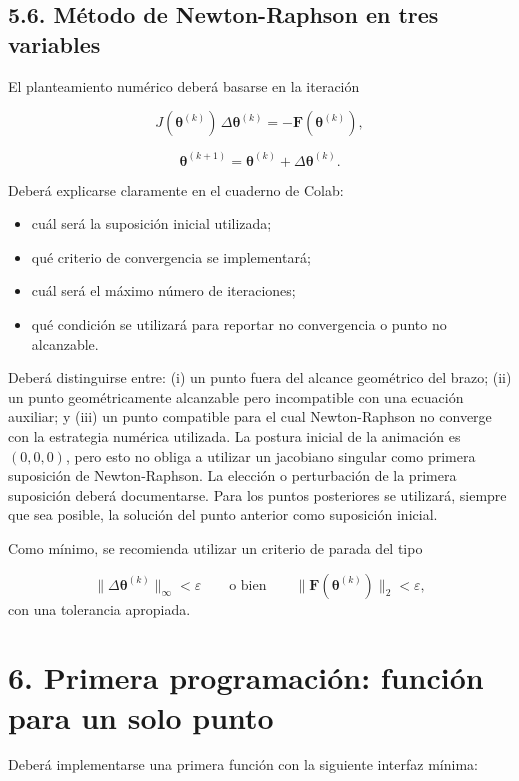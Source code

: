 \documentclass[12pt]{article}
\begin{document}
\subsection*{5.6. Método de Newton-Raphson en tres variables}

El planteamiento numérico deberá basarse en la iteración

\[
J(\boldsymbol{\theta}^{(k)})\,\Delta \boldsymbol{\theta}^{(k)}
=
-\mathbf{F}(\boldsymbol{\theta}^{(k)}),
\]

\[
\boldsymbol{\theta}^{(k+1)}
=
\boldsymbol{\theta}^{(k)}+\Delta \boldsymbol{\theta}^{(k)}.
\]

Deberá explicarse claramente en el cuaderno de Colab:

\begin{itemize}
    \item cuál será la suposición inicial utilizada;
    \item qué criterio de convergencia se implementará;
    \item cuál será el máximo número de iteraciones;
    \item qué condición se utilizará para reportar no convergencia o punto no alcanzable.
\end{itemize}

Deberá distinguirse entre: (i) un punto fuera del alcance geométrico del brazo; (ii) un punto geométricamente alcanzable pero incompatible con una ecuación auxiliar; y (iii) un punto compatible para el cual Newton-Raphson no converge con la estrategia numérica utilizada. La postura inicial de la animación es \((0,0,0)\), pero esto no obliga a utilizar un jacobiano singular como primera suposición de Newton-Raphson. La elección o perturbación de la primera suposición deberá documentarse. Para los puntos posteriores se utilizará, siempre que sea posible, la solución del punto anterior como suposición inicial.

Como mínimo, se recomienda utilizar un criterio de parada del tipo

\[
\|\Delta \boldsymbol{\theta}^{(k)}\|_{\infty}<\varepsilon
\qquad \text{o bien} \qquad
\|\mathbf{F}(\boldsymbol{\theta}^{(k)})\|_2<\varepsilon,
\]
con una tolerancia apropiada.

\section*{6. Primera programación: función para un solo punto}

Deberá implementarse una primera función con la siguiente interfaz mínima:
\end{document}
